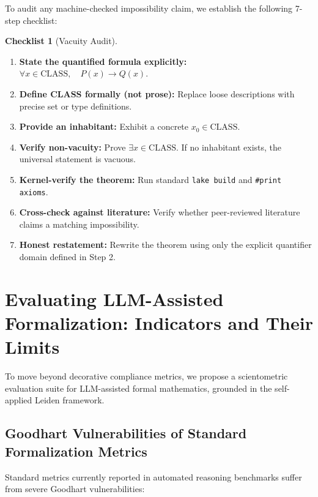 \documentclass[11pt,a4paper]{article}
\theoremstyle{definition}
\newtheorem{checklist}{Checklist}
\theoremstyle{remark}
\begin{document}
To audit any machine-checked impossibility claim, we establish the following 7-step checklist:

\begin{checklist}[Vacuity Audit]
\label{checklist:vacuity}
\mbox{}
\begin{enumerate}[label=\arabic*)]
  \item \textbf{State the quantified formula explicitly:} $\forall x \in \text{CLASS}, \quad P(x) \to Q(x)$.
  \item \textbf{Define CLASS formally (not prose):} Replace loose descriptions with precise set or type definitions.
  \item \textbf{Provide an inhabitant:} Exhibit a concrete $x_0 \in \text{CLASS}$.
  \item \textbf{Verify non-vacuity:} Prove $\exists x \in \text{CLASS}$. If no inhabitant exists, the universal statement is vacuous.
  \item \textbf{Kernel-verify the theorem:} Run standard \texttt{lake build} and \texttt{\#print axioms}.
  \item \textbf{Cross-check against literature:} Verify whether peer-reviewed literature claims a matching impossibility.
  \item \textbf{Honest restatement:} Rewrite the theorem using only the explicit quantifier domain defined in Step 2.
\end{enumerate}
\end{checklist}

\section{Evaluating LLM-Assisted Formalization: Indicators and Their Limits}
\label{sec:indicators}

To move beyond decorative compliance metrics, we propose a scientometric evaluation suite for LLM-assisted formal mathematics, grounded in the self-applied Leiden framework.

\subsection{Goodhart Vulnerabilities of Standard Formalization Metrics}

Standard metrics currently reported in automated reasoning benchmarks suffer from severe Goodhart vulnerabilities:
\end{document}
